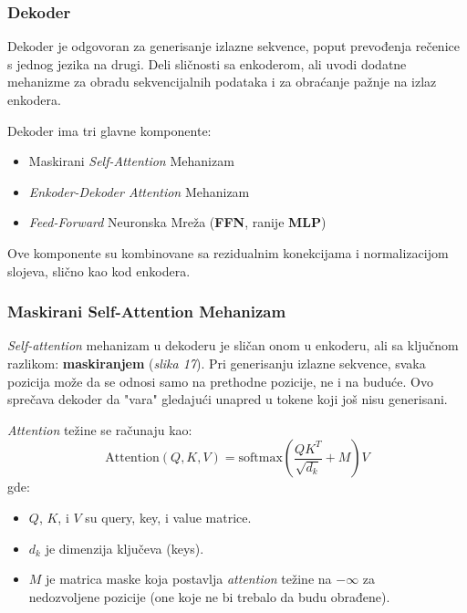 \documentclass[12pt]{article}
\begin{document}
   \subsubsection{Dekoder}
   Dekoder je odgovoran za generisanje izlazne sekvence, poput prevođenja rečenice s jednog jezika 
   na drugi. Deli sličnosti sa enkoderom, ali uvodi dodatne mehanizme za obradu sekvencijalnih 
   podataka i za obraćanje pažnje na izlaz enkodera.

   Dekoder ima tri glavne komponente:
   \begin{itemize}
      \item Maskirani \textit{Self-Attention} Mehanizam
      \item \textit{Enkoder-Dekoder Attention} Mehanizam
      \item \textit{Feed-Forward} Neuronska Mreža (\textbf{FFN}, ranije \textbf{MLP})
   \end{itemize}

   Ove komponente su kombinovane sa rezidualnim konekcijama i 
   normalizacijom slojeva, slično kao kod enkodera.

   \subsubsection*{Maskirani Self-Attention Mehanizam}
   \textit{Self-attention} mehanizam u dekoderu je sličan onom u enkoderu, ali sa 
   ključnom razlikom: \textbf{maskiranjem} (\textit{slika 17}). Pri generisanju izlazne sekvence, 
   svaka pozicija može da se odnosi samo na prethodne pozicije, ne i na buduće. 
   Ovo sprečava dekoder da "vara" gledajući unapred u tokene koji još nisu generisani.

   \textit{Attention} težine se računaju kao:
   \[
   \text{Attention}(Q, K, V) = \text{softmax}\left(\frac{QK^T}{\sqrt{d_k}} + M\right)V
   \]
   \vspace{-0.7cm}
   gde:
   \begin{itemize}
      \item \( Q \), \( K \), i \( V \) su query, key, i value matrice.
      \item \( d_k \) je dimenzija ključeva (keys).
      \item \( M \) je matrica maske koja postavlja \textit{attention} težine na
      $-\infty$ za \\ nedozvoljene pozicije (one koje ne bi trebalo da budu obrađene).
   \end{itemize}
\end{document}
